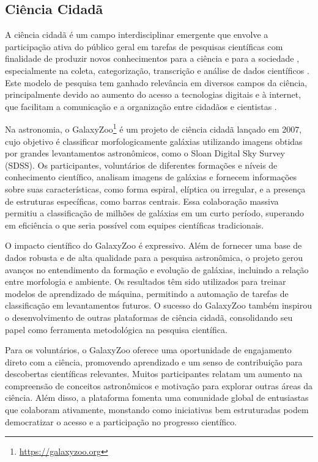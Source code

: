 \subsection{Ciência Cidadã}
\label{sec:cs}
A ciência cidadã é um campo interdisciplinar emergente que envolve a participação ativa do público geral em tarefas de pesquisas científicas com finalidade de produzir novos conhecimentos para a ciência e para a sociedade \citep{scs-1}, especialmente na coleta, categorização, transcrição e análise de dados científicos \citep{silvertown2009,bonney2014}. Este modelo de pesquisa tem ganhado relevância em diversos campos da ciência, principalmente devido ao aumento do acesso a tecnologias digitais e à internet, que facilitam a comunicação e a organização entre cidadãos e cientistas \citep{scs-4}.

Na astronomia, o GalaxyZoo\footnote{\url{https://galaxyzoo.org}} \citep{gz} é um projeto de ciência cidadã lançado em 2007, cujo objetivo é classificar morfologicamente galáxias utilizando imagens obtidas por grandes levantamentos astronômicos, como o Sloan Digital Sky Survey (SDSS). Os participantes, voluntários de diferentes formações e níveis de conhecimento científico, analisam imagens de galáxias e fornecem informações sobre suas características, como forma espiral, elíptica ou irregular, e a presença de estruturas específicas, como barras centrais. Essa colaboração massiva permitiu a classificação de milhões de galáxias em um curto período, superando em eficiência o que seria possível com equipes científicas tradicionais.

O impacto científico do GalaxyZoo é expressivo. Além de fornecer uma base de dados robusta e de alta qualidade para a pesquisa astronômica, o projeto gerou avanços no entendimento da formação e evolução de galáxias, incluindo a relação entre morfologia e ambiente. Os resultados têm sido utilizados para treinar modelos de aprendizado de máquina, permitindo a automação de tarefas de classificação em levantamentos futuros. O sucesso do GalaxyZoo também inspirou o desenvolvimento de outras plataformas de ciência cidadã, consolidando seu papel como ferramenta metodológica na pesquisa científica.

Para os voluntários, o GalaxyZoo oferece uma oportunidade de engajamento direto com a ciência, promovendo aprendizado e um senso de contribuição para descobertas científicas relevantes. Muitos participantes relatam um aumento na compreensão de conceitos astronômicos e motivação para explorar outras áreas da ciência. Além disso, a plataforma fomenta uma comunidade global de entusiastas que colaboram ativamente, monstando como iniciativas bem estruturadas podem democratizar o acesso e a participação no progresso científico.



